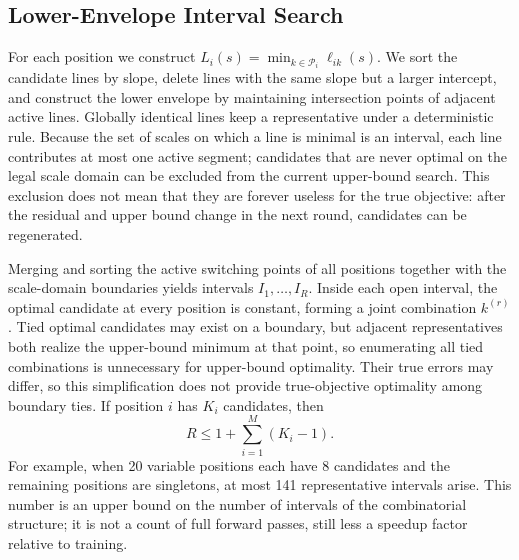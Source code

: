 \subsection{Lower-Envelope Interval Search}

For each position we construct $L_i(s)=\min_{k\in\mathcal P_i}\ell_{ik}(s)$.
We sort the candidate lines by slope, delete lines with the same slope but a larger intercept, and construct the lower envelope by maintaining intersection points of adjacent active lines.
Globally identical lines keep a representative under a deterministic rule.
Because the set of scales on which a line is minimal is an interval, each line contributes at most one active segment; candidates that are never optimal on the legal scale domain can be excluded from the current upper-bound search.
This exclusion does not mean that they are forever useless for the true objective: after the residual and upper bound change in the next round, candidates can be regenerated.

Merging and sorting the active switching points of all positions together with the scale-domain boundaries yields intervals $I_1,\ldots,I_R$.
Inside each open interval, the optimal candidate at every position is constant, forming a joint combination $k^{(r)}$.
Tied optimal candidates may exist on a boundary, but adjacent representatives both realize the upper-bound minimum at that point, so enumerating all tied combinations is unnecessary for upper-bound optimality.
Their true errors may differ, so this simplification does not provide true-objective optimality among boundary ties.
If position $i$ has $K_i$ candidates, then
\begin{equation}
R\le1+\sum_{i=1}^{M}(K_i-1).
\label{eq:R}
\end{equation}
For example, when 20 variable positions each have 8 candidates and the remaining positions are singletons, at most 141 representative intervals arise.
This number is an upper bound on the number of intervals of the combinatorial structure; it is not a count of full forward passes, still less a speedup factor relative to training.


